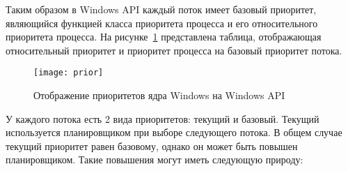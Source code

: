 Таким образом в Windows API каждый поток имеет базовый приоритет, являющийся функцией класса приоритета процесса и его относительного приоритета процесса. На рисунке~\ref{fig:prior-win} представлена таблица, отображающая относительный приоритет и приоритет процесса на  базовый приоритет потока.

\begin{figure}[H]
	\centering
	\texttt{[image: prior]}
	\caption{Отображение приоритетов ядра Windows на Windows API}
	\label{fig:prior-win}
\end{figure}

У каждого потока есть 2 вида приоритетов: текущий и базовый. Текущий используется планировщиком при выборе следующего потока. В общем случае текущий приоритет равен базовому, однако он может быть повышен планировщиком. Такие повышения могут иметь следующую природу:

